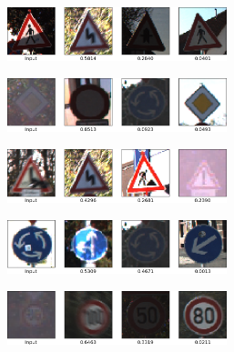 \documentclass[11pt, a4paper]{article}
\begin{document}
\begin{figure}
	\centering
	\begin{subfigure}{\textwidth}
		\centering
		\caption{}
		\includegraphics[width=0.7\textwidth]{gtsrb_mistakes/mistake_fussgaenger}
		\label{fig:gtsrb-mistakes-01}
	\end{subfigure}
	\begin{subfigure}{\textwidth}
		\centering
		\caption{}
		\includegraphics[width=0.7\textwidth]{gtsrb_mistakes/mistake_vorfahrtstrasse}
		\label{fig:gtsrb-mistakes-02}
	\end{subfigure}
	\begin{subfigure}{\textwidth}
		\centering
		\caption{}
		\includegraphics[width=0.7\textwidth]{gtsrb_mistakes/mistake_gefahrenstelle}
		\label{fig:gtsrb-mistakes-03}
	\end{subfigure}
	\begin{subfigure}{\textwidth}
		\centering
		\caption{}
		\includegraphics[width=0.7\textwidth]{gtsrb_mistakes/mistake_kreisverkehr}
		\label{fig:gtsrb-mistakes-04}
	\end{subfigure}
	\begin{subfigure}{\textwidth}
		\centering
		\caption{}
		\includegraphics[width=0.7\textwidth]{gtsrb_mistakes/mistake_limit_unknown}

\end{subfigure}
\end{figure}
\end{document}
